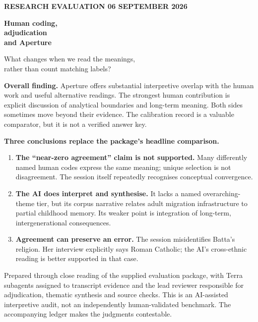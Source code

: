 \documentclass[10pt,a4paper]{article}
\newcommand{\kicker}[1]{{\sffamily\small\bfseries\color{teal}#1}\par\vspace{5pt}}
\begin{document}
\thispagestyle{empty}
\vspace*{7mm}
\kicker{RESEARCH EVALUATION \hfill 06 SEPTEMBER 2026}
{\sffamily\fontsize{34}{38}\selectfont\bfseries\color{ink}Human coding,\\adjudication\\and Aperture\par}
\vspace{5mm}
{\Large\color{muted}What changes when we read the meanings,\\rather than count matching labels?\par}
\vspace{10mm}
\vspace{7mm}
\begin{takeaway}
\textbf{Overall finding.} Aperture offers substantial interpretive overlap with the human work and useful alternative readings. The strongest human contribution is explicit discussion of analytical boundaries and long-term meaning. Both sides sometimes move beyond their evidence. The calibration record is a valuable comparator, but it is not a verified answer key.
\end{takeaway}
\vspace{3mm}
\textbf{Three conclusions replace the package's headline comparison.}
\begin{enumerate}
\item \textbf{The ``near-zero agreement'' claim is not supported.} Many differently named human codes express the same meaning; unique selection is not disagreement. The session itself repeatedly recognises conceptual convergence.
\item \textbf{The AI does interpret and synthesise.} It lacks a named overarching-theme tier, but its corpus narrative relates adult migration infrastructure to partial childhood memory. Its weaker point is integration of long-term, intergenerational consequences.
\item \textbf{Agreement can preserve an error.} The session misidentifies Batta's religion. Her interview explicitly says Roman Catholic; the AI's cross-ethnic reading is better supported in that case.
\end{enumerate}
\vfill
{\small\color{muted}Prepared through close reading of the supplied evaluation package, with Terra subagents assigned to transcript evidence and the lead reviewer responsible for adjudication, thematic synthesis and source checks. This is an AI-assisted interpretive audit, not an independently human-validated benchmark. The accompanying ledger makes the judgments contestable.}
\end{document}
